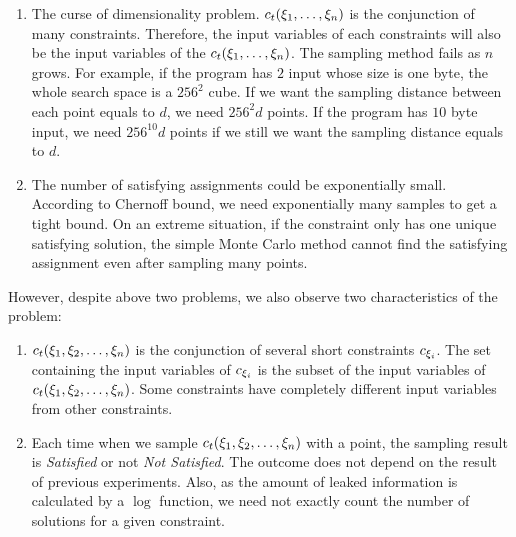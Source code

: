 \begin{enumerate}
    \item The curse of dimensionality problem. $c_t({{\xi}_{1}},\ldots,{{\xi}_{n}})$ is
          the conjunction of many constraints. Therefore, the input variables
          of each constraints will also be the input variables of the
          $c_t({{\xi}_{1}},\ldots,{{\xi}_{n}})$. The sampling method fails
          as $n$ grows.
          For example, if the program has $2$ input whose size is
          one byte, the whole search space is a $256^2$ cube. If we want
          the sampling distance between each point equals to $d$, we need
          $256^2d$ points. If the program has $10$ byte input, we need
          $256^{10}d$ points if we still we want the sampling distance equals
          to $d$.

    \item The number of satisfying assignments could be exponentially small.
          According to Chernoff bound, we need exponentially many samples to
          get a tight bound.
          On an extreme situation, if the constraint only
          has one unique satisfying solution, the simple Monte Carlo method
          cannot find the satisfying assignment even after sampling many
          points.
\end{enumerate}

However, despite above two problems, we also observe two characteristics of the
problem:
\begin{enumerate}
    \item $c_t({{\xi}_{1}},{{\xi}_{2}},\ldots,{{\xi}_{n}})$ is the conjunction of
          several short constraints $c_{{\xi}_{i}}$. The set containing the
          input variables of $c_{{\xi}_{i}}$ is the subset of the input
          variables of $c_t({{\xi}_{1}},{{\xi}_{2}},\ldots,{{\xi}_{n}})$. Some
          constraints have completely different input variables from other
          constraints.

    \item Each time when we sample $c_t({{\xi}_{1}},{{\xi}_{2}},\ldots,{{\xi}_{n}})$
          with a point, the sampling result is \emph{Satisfied} or not \emph{Not Satisfied}.
          The outcome does not depend on the result of
          previous experiments. Also, as the amount of leaked information is calculated
          by a $\log$ function, we need not exactly count the number of solutions for
          a given constraint.


\end{enumerate}

